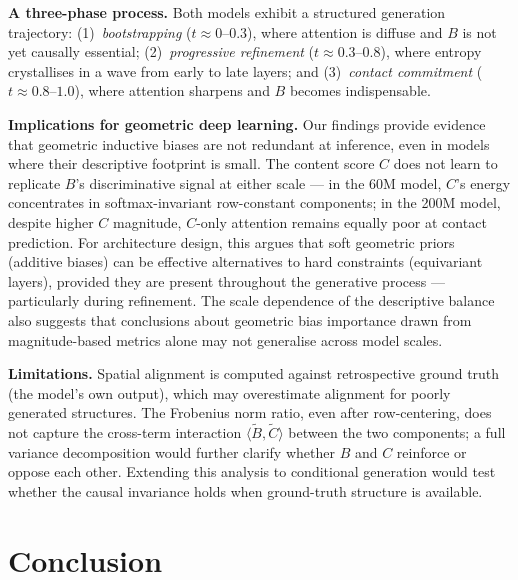 \documentclass{article}
\begin{document}
\textbf{A three-phase process.}
Both models exhibit a structured generation trajectory: (1)~\emph{bootstrapping} ($t \approx 0$--$0.3$), where attention is diffuse and $B$ is not yet causally essential; (2)~\emph{progressive refinement} ($t \approx 0.3$--$0.8$), where entropy crystallises in a wave from early to late layers; and (3)~\emph{contact commitment} ($t \approx 0.8$--$1.0$), where attention sharpens and $B$ becomes indispensable.

\textbf{Implications for geometric deep learning.}
Our findings provide evidence that geometric inductive biases are not redundant at inference, even in models where their descriptive footprint is small.
The content score $C$ does not learn to replicate $B$'s discriminative signal at either scale --- in the 60M model, $C$'s energy concentrates in softmax-invariant row-constant components; in the 200M model, despite higher $C$ magnitude, $C$-only attention remains equally poor at contact prediction.
For architecture design, this argues that soft geometric priors (additive biases) can be effective alternatives to hard constraints (equivariant layers), provided they are present throughout the generative process --- particularly during refinement.
The scale dependence of the descriptive balance also suggests that conclusions about geometric bias importance drawn from magnitude-based metrics alone may not generalise across model scales.

\textbf{Limitations.}
Spatial alignment is computed against retrospective ground truth (the model's own output), which may overestimate alignment for poorly generated structures.
The Frobenius norm ratio, even after row-centering, does not capture the cross-term interaction $\langle \tilde{B}, \tilde{C} \rangle$ between the two components; a full variance decomposition would further clarify whether $B$ and $C$ reinforce or oppose each other.
Extending this analysis to conditional generation would test whether the causal invariance holds when ground-truth structure is available.

\section{Conclusion}
\end{document}
